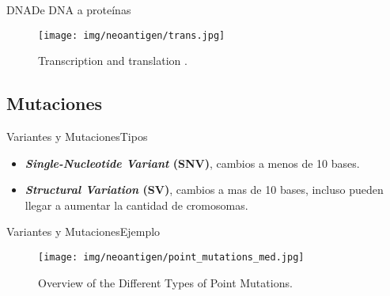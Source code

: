 \documentclass[10pt]{beamer}
\newcommand{\1}{
	\setbeamertemplate{background}{
		\texttt{[image: img/1]}
		\tikz[overlay] \fill[fill opacity=0.75,fill=white] (0,0) rectangle (-\paperwidth,\paperheight);
	}
}
\begin{document}
\begin{frame}{DNA}{De DNA a proteínas}
	\begin{figure}[]
		\centering
		\texttt{[image: img/neoantigen/trans.jpg]}
		\caption{Transcription and translation \cite{nci2020}.}
	\end{figure}
\end{frame}

\subsection{Mutaciones}

\begin{frame}{Variantes y Mutaciones}{Tipos}
	\begin{block}{}
		\begin{itemize}
			\item \textbf{\textit{Single-Nucleotide Variant} (SNV)}, cambios a menos de 10 bases.
			\item \textbf{\textit{Structural Variation} (SV)}, cambios a mas de 10 bases, incluso pueden llegar a aumentar la cantidad de cromosomas.
		\end{itemize}	
	\end{block}
\end{frame}

\begin{frame}{Variantes y Mutaciones}{Ejemplo}
	\begin{figure}[]
		\centering
		\texttt{[image: img/neoantigen/point\_mutations\_med.jpg]}
		\label{img:alig}
		\caption{Overview of the Different Types of Point Mutations.}
	\end{figure}
\end{frame}
\end{document}
